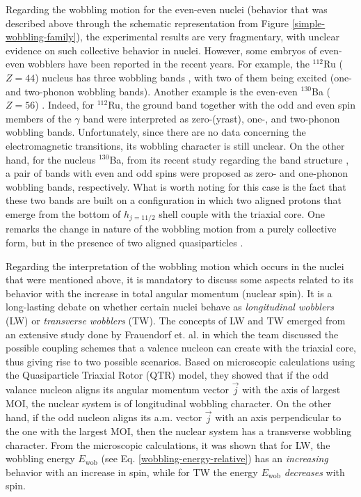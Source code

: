 \documentclass[11pt]{article}
\begin{document}
Regarding the wobbling motion for the even-even nuclei (behavior that was described above through the schematic representation from Figure \ref{simple-wobbling-family}), the experimental results are very fragmentary, with unclear evidence on such collective behavior in nuclei. However, some embryos of even-even wobblers have been reported in the recent years. For example, the $^{112}$Ru ($Z=44$) nucleus has three wobbling bands \cite{hamilton2010super}, with two of them being excited (one- and two-phonon wobbling bands). Another example is the even-even $^{130}$Ba ($Z=56$) \cite{petrache2019diversity,wang2020two,chen2019transverse}. Indeed, for $^{112}$Ru, the ground band together with the odd and even spin members of the $\gamma$ band were interpreted as zero-(yrast), one-, and two-phonon wobbling bands. Unfortunately, since there are no data concerning the electromagnetic transitions, its wobbling character is still unclear. On the other hand, for the nucleus $^{130}$Ba, from its recent study regarding the band structure \cite{petrache2019diversity}, a pair of bands with even and odd spins were proposed as zero- and one-phonon wobbling bands, respectively. What is worth noting for this case is the fact that these two bands are built on a configuration in which two aligned protons that emerge from the bottom of $h_{j=11/2}$ shell couple with the triaxial core. One remarks the change in nature of the wobbling motion from a purely collective form, but in the presence of two aligned quasiparticles \cite{wang2020two}.

Regarding the interpretation of the wobbling motion which occurs in the nuclei that were mentioned above, it is mandatory to discuss some aspects related to its behavior with the increase in total angular momentum (nuclear spin). It is a long-lasting debate on whether certain nuclei behave as \emph{longitudinal wobblers} (LW) or \emph{transverse wobblers} (TW). The concepts of LW and TW emerged from an extensive study done by Frauendorf et. al. \cite{frauendorf2014transverse} in which the team discussed the possible coupling schemes that a valence nucleon can create with the triaxial core, thus giving rise to two possible scenarios. Based on microscopic calculations using the Quasiparticle Triaxial Rotor (QTR) model, they showed that if the odd valance nucleon aligns its angular momentum vector $\vec{j}$ with the axis of largest MOI, the nuclear system is of longitudinal wobbling character. On the other hand, if the odd nucleon aligns its a.m. vector $\vec{j}$ with an axis perpendicular to the one with the largest MOI, then the nuclear system has a transverse wobbling character. From the microscopic calculations, it was shown that for LW, the wobbling energy $E_\text{wob}$ (see Eq. \ref{wobbling-energy-relative}) has an \emph{increasing} behavior with an increase in spin, while for TW the energy $E_\text{wob}$ \emph{decreases} with spin.
\end{document}
